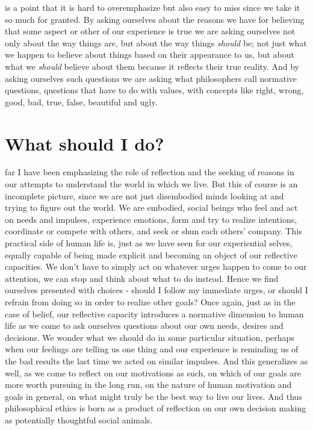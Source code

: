 \documentclass[justified]{tufte-book}
\begin{document}
 is a point that it is hard to overemphasize but also easy to miss since we take it so much for granted. By asking ourselves about the reasons we have for believing that some aspect or other of our experience is true we are asking ourselves not only about the way things are, but about the way things \emph{should} be; not just what we happen to believe about things based on their appearance to us, but about what we \emph{should} believe about them because it reflects their true reality. And by asking ourselves such questions we are asking what philosophers call normative questions, questions that have to do with values, with concepts like right, wrong, good, bad, true, false, beautiful and ugly.

\hypertarget{what-should-i-do}{%
\section{What should I do?}\label{what-should-i-do}}

 far I have been emphasizing the role of reflection and the seeking of reasons in our attempts to understand the world in which we live. But this of course is an incomplete picture, since we are not just disembodied minds looking at and trying to figure out the world. We are embodied, social beings who feel and act on needs and impulses, experience emotions, form and try to realize intentions, coordinate or compete with others, and seek or shun each others' company. This practical side of human life is, just as we have seen for our experiential selves, equally capable of being made explicit and becoming an object of our reflective capacities. We don't have to simply act on whatever urges happen to come to our attention, we can stop and think about what to do instead. Hence we find ourselves presented with choices - should I follow my immediate urges, or should I refrain from doing so in order to realize other goals? Once again, just as in the case of belief, our reflective capacity introduces a normative dimension to human life as we come to ask ourselves questions about our own needs, desires and decisions. We wonder what we should do in some particular situation, perhaps when our feelings are telling us one thing and our experience is reminding us of the bad results the last time we acted on similar impulses. And this generalizes as well, as we come to reflect on our motivations as such, on which of our goals are more worth pursuing in the long run, on the nature of human motivation and goals in general, on what might truly be the best way to live our lives. And thus philosophical ethics is born as a product of reflection on our own decision making as potentially thoughtful social animals.
\end{document}
